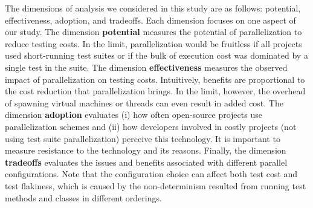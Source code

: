 

The dimensions of analysis we considered in this study are as follows:
potential, effectiveness, adoption, and tradeoffs.  Each dimension
focuses on one aspect of our study.  The dimension \textbf{potential}
measures the potential of parallelization to reduce testing costs.  In
the limit, parallelization would be fruitless if all projects used
short-running test suites or if the bulk of execution cost was
dominated by a single test in the suite.  The dimension
\textbf{effectiveness} measures the observed impact of
parallelization on testing costs.  Intuitively, benefits are
proportional to the cost reduction that parallelization brings.  In
the limit, however, the overhead of spawning virtual machines or
threads can even result in added cost.  The dimension
\textbf{adoption} evaluates (i) how often open-source projects use
parallelization schemes and (ii) how developers involved in costly
projects (not using test suite parallelization) perceive this
technology.  It is important to measure resistance to the technology
and its reasons.  Finally, the dimension \textbf{tradeoffs} evaluates
the issues and benefits associated with different parallel configurations.  Note that the
configuration choice can affect both test cost and test flakiness,
which is caused by the non-determinism resulted from running test
methods and classes in different orderings.


